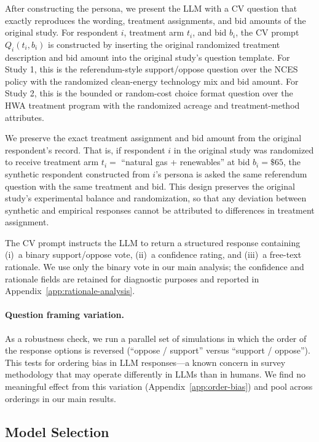 \documentclass[12pt]{article}
\begin{document}
After constructing the persona, we present the LLM with a CV question that exactly reproduces the wording, treatment assignments, and bid amounts of the original study. For respondent $i$, treatment arm $t_i$, and bid $b_i$, the CV prompt $Q_i(t_i, b_i)$ is constructed by inserting the original randomized treatment description and bid amount into the original study's question template. For Study 1, this is the referendum-style support/oppose question over the NCES policy with the randomized clean-energy technology mix and bid amount. For Study 2, this is the bounded or random-cost choice format question over the HWA treatment program with the randomized acreage and treatment-method attributes.

We preserve the exact treatment assignment and bid amount from the original respondent's record. That is, if respondent $i$ in the original study was randomized to receive treatment arm $t_i = $ ``natural gas + renewables'' at bid $b_i = \$65$, the synthetic respondent constructed from $i$'s persona is asked the same referendum question with the same treatment and bid. This design preserves the original study's experimental balance and randomization, so that any deviation between synthetic and empirical responses cannot be attributed to differences in treatment assignment.

The CV prompt instructs the LLM to return a structured response containing (i)~a binary support/oppose vote, (ii)~a confidence rating, and (iii)~a free-text rationale. We use only the binary vote in our main analysis; the confidence and rationale fields are retained for diagnostic purposes and reported in Appendix~\ref{app:rationale-analysis}.

\paragraph{Question framing variation.} As a robustness check, we run a parallel set of simulations in which the order of the response options is reversed (``oppose / support'' versus ``support / oppose''). This tests for ordering bias in LLM responses---a known concern in survey methodology that may operate differently in LLMs than in humans. We find no meaningful effect from this variation (Appendix~\ref{app:order-bias}) and pool across orderings in our main results.

\subsection{Model Selection}\label{sec:methods-models}
\end{document}
